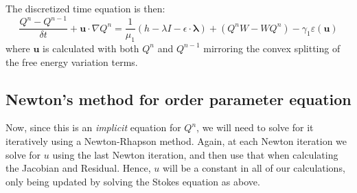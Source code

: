 \documentclass[reqno]{article}
\begin{document}
  The discretized time equation is then:
  \begin{equation}
    \frac{Q^n - Q^{n - 1}}{\delta t}
    + \mathbf{u} \cdot \nabla Q^n
    =
    \frac{1}{\mu_1} \left( h - \lambda I - \epsilon \cdot \boldsymbol\lambda \right)
    + \left( Q^n W - W Q^n \right)
    - \gamma_1 \varepsilon(\mathbf{u})
  \end{equation}
  where $\mathbf{u}$ is calculated with both $Q^n$ and $Q^{n - 1}$ mirroring the
  convex splitting of the free energy variation terms.

  \subsection{Newton's method for order parameter equation}
  Now, since this is an \textit{implicit} equation for $Q^n$, we will need to
  solve for it iteratively using a Newton-Rhapson method.
  Again, at each Newton iteration we solve for $u$ using the last Newton
  iteration, and then use that when calculating the Jacobian and Residual.
  Hence, $u$ will be a constant in all of our calculations, only being updated
  by solving the Stokes equation as above.
\end{document}
